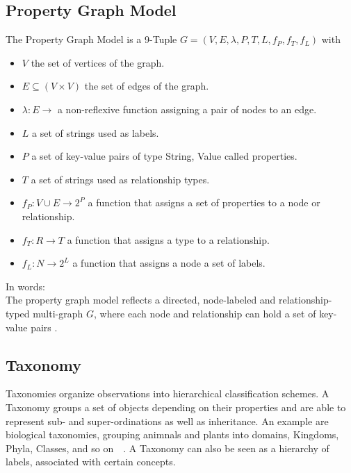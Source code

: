\subsection{Property Graph Model}
The Property Graph Model is a 9-Tuple $G = (V, E, \lambda, P, T, L, f_P, f_T, f_L)$ with 
\begin{itemize}
    \item $V$ the set of vertices of the graph.
    \item $E \subseteq (V \times V)$ the set of edges of the graph.
    \item $\lambda: E \rightarrow $ a non-reflexive
 function assigning a pair of nodes to an edge.
    \item $L$ a set of strings used as labels.
    \item $P$ a set of key-value pairs of type String, Value called properties.
    \item $T$ a set of strings used as relationship types.
    \item $f_P: V \cup E \rightarrow 2^P$ a function that assigns a set of properties to a node or relationship.
   \item $f_T: R \rightarrow T$ a function that assigns a type to  a relationship.
   \item  $f_L: N \rightarrow 2^L$ a function that assigns a node a set of labels.
\end{itemize} 
\smallskip
In words: \\
The property graph model reflects a directed, node-labeled and relationship-typed multi-graph $G$, where each node and relationship can hold a set of key-value pairs \cite{angles2018property}.


\subsection{Taxonomy}
Taxonomies organize observations into hierarchical classification schemes. A Taxonomy groups a set of objects depending on their properties and are able to represent sub- and super-ordinations as well as inheritance. An example are biological taxonomies, grouping animnals and plants into domains, Kingdoms, Phyla, Classes, and so on~\cite{Krcmar2015}~\cite{han2011data}. A Taxonomy can also be seen as a hierarchy of labels, associated with certain concepts. \\


